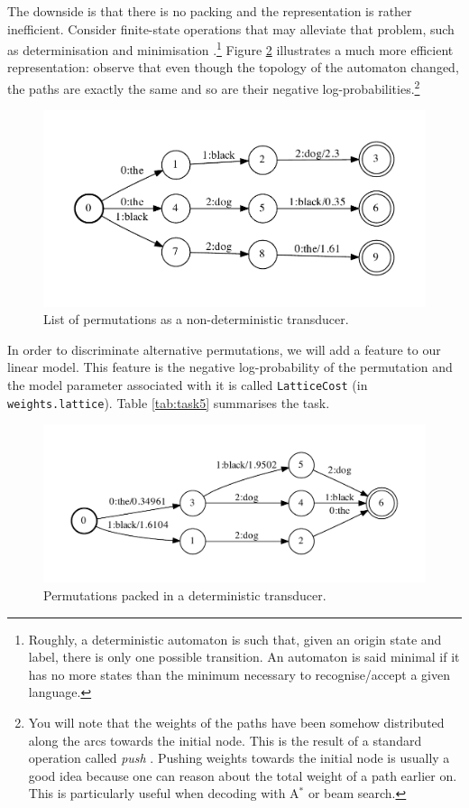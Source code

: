 The downside is that there is no packing and the representation is rather inefficient.
Consider finite-state operations that may alleviate that problem, such as determinisation and  minimisation \citep{Mohri:2009:WAA}.\footnote{Roughly, a deterministic automaton is such that, given an origin state and label, there is only one possible transition. An automaton is said minimal if it has no more states than the minimum necessary to recognise/accept a given language.} Figure \ref{fig:pi-det-min} illustrates a much more efficient representation: observe that even though the topology of the automaton changed, the paths are exactly the same and so are their negative log-probabilities.\footnote{You will note that the weights of the paths have been somehow distributed along the arcs towards the initial node. This is the result of a standard operation called \emph{push} \citep{Mohri:2009:WAA}. Pushing weights towards the initial node is usually a good idea because one can reason about the total weight of a path earlier on. This is particularly useful when decoding with A$^*$ or beam search.}

\begin{figure}[h]\centering
\includegraphics[scale=0.5]{permutations-list.pdf}
\caption{\label{fig:permutations}List of permutations as a non-deterministic transducer.}
\end{figure}


In order to discriminate alternative permutations, we will add a feature to our linear model. 
This feature is the negative log-probability of the permutation and the model parameter associated with it is called \texttt{LatticeCost} (in \texttt{weights.lattice}).
Table \ref{tab:task5} summarises the task. 

\begin{figure}[h]\centering
\includegraphics[scale=0.5]{permutations-lattice.pdf}
\caption{\label{fig:pi-det-min}Permutations packed in a deterministic transducer.}
\end{figure}

